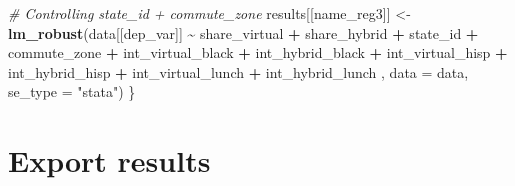 \documentclass[
]{article}
\newenvironment{Shaded}{\begin{snugshade}}{\end{snugshade}}
\newcommand{\AttributeTok}[1]{\textcolor[rgb]{0.13,0.29,0.53}{#1}}
\newcommand{\CommentTok}[1]{\textcolor[rgb]{0.56,0.35,0.01}{\textit{#1}}}
\newcommand{\FunctionTok}[1]{\textcolor[rgb]{0.13,0.29,0.53}{\textbf{#1}}}
\newcommand{\NormalTok}[1]{#1}
\newcommand{\OtherTok}[1]{\textcolor[rgb]{0.56,0.35,0.01}{#1}}
\newcommand{\SpecialCharTok}[1]{\textcolor[rgb]{0.81,0.36,0.00}{\textbf{#1}}}
\newcommand{\StringTok}[1]{\textcolor[rgb]{0.31,0.60,0.02}{#1}}
\begin{document}
\begin{Shaded}
\begin{Highlighting}[]
  \CommentTok{\# Controlling state\_id + commute\_zone}
\NormalTok{  results[[name\_reg3]] }\OtherTok{\textless{}{-}} \FunctionTok{lm\_robust}\NormalTok{(data[[dep\_var]] }\SpecialCharTok{\textasciitilde{}}\NormalTok{ share\_virtual }\SpecialCharTok{+}\NormalTok{ share\_hybrid }
                                    \SpecialCharTok{+}\NormalTok{ state\_id }\SpecialCharTok{+}\NormalTok{ commute\_zone}
                                    \SpecialCharTok{+}\NormalTok{ int\_virtual\_black }\SpecialCharTok{+}\NormalTok{ int\_hybrid\_black }
                                    \SpecialCharTok{+}\NormalTok{ int\_virtual\_hisp }\SpecialCharTok{+}\NormalTok{ int\_hybrid\_hisp }
                                    \SpecialCharTok{+}\NormalTok{ int\_virtual\_lunch }\SpecialCharTok{+}\NormalTok{ int\_hybrid\_lunch}
\NormalTok{                                    , }\AttributeTok{data =}\NormalTok{ data, }\AttributeTok{se\_type =} \StringTok{"stata"}\NormalTok{)  }
\NormalTok{\}}
\end{Highlighting}
\end{Shaded}

\section{Export results}\label{export-results}
\end{document}

